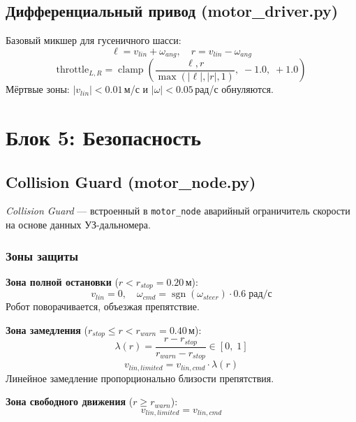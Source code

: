 \documentclass[12pt, a4paper]{article}
\DeclareMathOperator{\sgn}{sgn}
\DeclareMathOperator{\clamp}{clamp}
\begin{document}
\subsection{Дифференциальный привод (motor\_driver.py)}

Базовый микшер для гусеничного шасси:
\begin{equation}
  \ell = v_{lin} + \omega_{ang}, \quad r = v_{lin} - \omega_{ang}
\end{equation}
\begin{equation}
  \text{throttle}_{L,R} = \clamp\!\left(\frac{\ell, r}{\max(|\ell|, |r|, 1)},\; -1.0,\; +1.0\right)
\end{equation}
Мёртвые зоны: $|v_{lin}| < 0.01$\,м/с и $|\omega| < 0.05$\,рад/с обнуляются.

\newpage
\section{Блок 5: Безопасность}
\label{sec:safety}

\subsection{Collision Guard (motor\_node.py)}
\label{sec:collision}

\textit{Collision Guard} — встроенный в \texttt{motor\_node} аварийный ограничитель скорости на основе данных УЗ-дальномера.

\subsubsection{Зоны защиты}

\begin{mathbox}
\textbf{Зона полной остановки} ($r < r_{stop} = 0.20$\,м):
\[
  v_{lin} = 0, \quad \omega_{cmd} = \sgn(\omega_{steer})\cdot 0.6\;\text{рад/с}
\]
Робот поворачивается, объезжая препятствие.

\textbf{Зона замедления} ($r_{stop} \leq r < r_{warn} = 0.40$\,м):
\[
  \lambda(r) = \frac{r - r_{stop}}{r_{warn} - r_{stop}} \in [0,\; 1]
\]
\[
  v_{lin,limited} = v_{lin,cmd} \cdot \lambda(r)
\]
Линейное замедление пропорционально близости препятствия.

\textbf{Зона свободного движения} ($r \geq r_{warn}$):
\[
  v_{lin,limited} = v_{lin,cmd}
\]
\end{mathbox}
\end{document}

